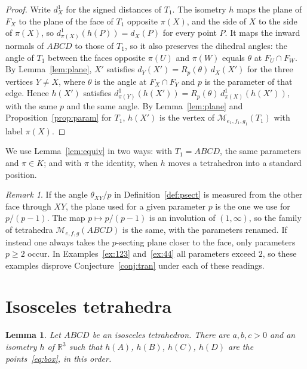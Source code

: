 \documentclass[11pt]{amsart}
\newtheorem{lemma}[theorem]{Lemma}
\theoremstyle{definition}
\theoremstyle{remark}
\newtheorem{remark}[theorem]{Remark}
\numberwithin{equation}{section}
\newcommand{\R}{\mathbb{R}}
\newcommand{\M}{\mathcal{M}}
\begin{document}
\begin{proof}
Write $d^1_X$ for the signed distances of $T_1$. The isometry $h$ maps the plane of $F_X$ to the plane of the face of $T_1$ opposite $\pi(X)$, and the side of $X$ to the side of $\pi(X)$, so $d^1_{\pi(X)}(h(P))=d_X(P)$ for every point $P$. It maps the inward normals of $ABCD$ to those of $T_1$, so it also preserves the dihedral angles: the angle of $T_1$ between the faces opposite $\pi(U)$ and $\pi(W)$ equals $\theta$ at $F_U\cap F_W$. By Lemma~\ref{lem:plane}, $X'$ satisfies $d_Y(X')=R_p(\theta)\,d_X(X')$ for the three vertices $Y\ne X$, where $\theta$ is the angle at $F_X\cap F_Y$ and $p$ is the parameter of that edge. Hence $h(X')$ satisfies $d^1_{\pi(Y)}(h(X'))=R_p(\theta)\,d^1_{\pi(X)}(h(X'))$, with the same $p$ and the same angle. By Lemma~\ref{lem:plane} and Proposition~\ref{prop:param} for $T_1$, $h(X')$ is the vertex of $\M_{e_1,f_1,g_1}(T_1)$ with label $\pi(X)$.
\end{proof}

We use Lemma~\ref{lem:equiv} in two ways: with $T_1=ABCD$, the same parameters and $\pi\in K$; and with $\pi$ the identity, when $h$ moves a tetrahedron into a standard position.

\begin{remark}\label{rem:reading}
If the angle $\theta_{XY}/p$ in Definition~\ref{def:psect} is measured from the other face through $XY$, the plane used for a given parameter $p$ is the one we use for $p/(p-1)$. The map $p\mapsto p/(p-1)$ is an involution of $(1,\infty)$, so the family of tetrahedra $\M_{e,f,g}(ABCD)$ is the same, with the parameters renamed. If instead one always takes the $p$-secting plane closer to the face, only parameters $p\ge2$ occur. In Examples~\ref{ex:123} and~\ref{ex:44} all parameters exceed $2$, so these examples disprove Conjecture~\ref{conj:tran} under each of these readings.
\end{remark}

\section{Isosceles tetrahedra}\label{sec:iso}

\begin{lemma}\label{lem:box}
Let $ABCD$ be an isosceles tetrahedron. There are $a,b,c>0$ and an isometry $h$ of $\R^3$ such that $h(A)$, $h(B)$, $h(C)$, $h(D)$ are the points~\eqref{eq:box}, in this order.
\end{lemma}
\end{document}

